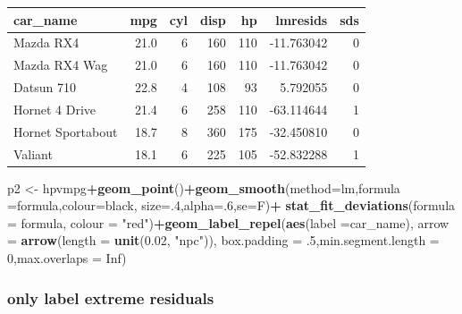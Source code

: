 \documentclass[
]{article}
\newenvironment{Shaded}{\begin{snugshade}}{\end{snugshade}}
\newcommand{\AttributeTok}[1]{\textcolor[rgb]{0.13,0.29,0.53}{#1}}
\newcommand{\ConstantTok}[1]{\textcolor[rgb]{0.56,0.35,0.01}{#1}}
\newcommand{\DecValTok}[1]{\textcolor[rgb]{0.00,0.00,0.81}{#1}}
\newcommand{\FloatTok}[1]{\textcolor[rgb]{0.00,0.00,0.81}{#1}}
\newcommand{\FunctionTok}[1]{\textcolor[rgb]{0.13,0.29,0.53}{\textbf{#1}}}
\newcommand{\NormalTok}[1]{#1}
\newcommand{\OtherTok}[1]{\textcolor[rgb]{0.56,0.35,0.01}{#1}}
\newcommand{\SpecialCharTok}[1]{\textcolor[rgb]{0.81,0.36,0.00}{\textbf{#1}}}
\newcommand{\StringTok}[1]{\textcolor[rgb]{0.31,0.60,0.02}{#1}}
\begin{document}
\begin{table}
\centering
\begin{tabular}{l|r|r|r|r|r|r}
\hline
car\_name & mpg & cyl & disp & hp & lmresids & sds\\
\hline
Mazda RX4 & 21.0 & 6 & 160 & 110 & -11.763042 & 0\\
\hline
Mazda RX4 Wag & 21.0 & 6 & 160 & 110 & -11.763042 & 0\\
\hline
Datsun 710 & 22.8 & 4 & 108 & 93 & 5.792055 & 0\\
\hline
Hornet 4 Drive & 21.4 & 6 & 258 & 110 & -63.114644 & 1\\
\hline
Hornet Sportabout & 18.7 & 8 & 360 & 175 & -32.450810 & 0\\
\hline
Valiant & 18.1 & 6 & 225 & 105 & -52.832288 & 1\\
\hline
\end{tabular}
\end{table}

\begin{Shaded}
\begin{Highlighting}[]
\NormalTok{p2 }\OtherTok{\textless{}{-}}\NormalTok{ hpvmpg}\SpecialCharTok{+}\FunctionTok{geom\_point}\NormalTok{()}\SpecialCharTok{+}\FunctionTok{geom\_smooth}\NormalTok{(}\AttributeTok{method=}\StringTok{\textquotesingle{}lm\textquotesingle{}}\NormalTok{,}\AttributeTok{formula =}\NormalTok{formula,}\AttributeTok{colour=}\StringTok{\textquotesingle{}black\textquotesingle{}}\NormalTok{, }\AttributeTok{size=}\NormalTok{.}\DecValTok{4}\NormalTok{,}\AttributeTok{alpha=}\NormalTok{.}\DecValTok{6}\NormalTok{,}\AttributeTok{se=}\NormalTok{F)}\SpecialCharTok{+}
  \FunctionTok{stat\_fit\_deviations}\NormalTok{(}\AttributeTok{formula =}\NormalTok{ formula, }\AttributeTok{colour =} \StringTok{"red"}\NormalTok{)}\SpecialCharTok{+}\FunctionTok{geom\_label\_repel}\NormalTok{(}\FunctionTok{aes}\NormalTok{(}\AttributeTok{label =}\NormalTok{car\_name),}
    \AttributeTok{arrow =} \FunctionTok{arrow}\NormalTok{(}\AttributeTok{length =} \FunctionTok{unit}\NormalTok{(}\FloatTok{0.02}\NormalTok{, }\StringTok{"npc"}\NormalTok{)),}
    \AttributeTok{box.padding =}\NormalTok{ .}\DecValTok{5}\NormalTok{,}\AttributeTok{min.segment.length =} \DecValTok{0}\NormalTok{,}\AttributeTok{max.overlaps =} \ConstantTok{Inf}\NormalTok{)}
\end{Highlighting}
\end{Shaded}

\hypertarget{only-label-extreme-residuals}{%
\subsubsection{only label extreme residuals}\label{only-label-extreme-residuals}}
\end{document}

